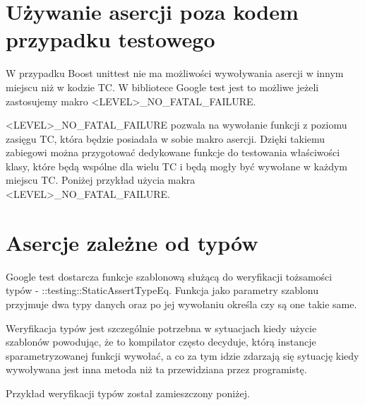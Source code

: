 \documentclass[12pt,a4paper,notitlepage]{report}
\begin{document}
\section{Używanie asercji poza kodem przypadku testowego}

W przypadku Boost unittest nie ma możliwości wywoływania asercji w innym miejscu niż w kodzie TC. W bibliotece Google test jest to możliwe jeżeli zastosujemy makro <LEVEL>{\_}NO{\_}FATAL{\_}FAILURE.

<LEVEL>{\_}NO{\_}FATAL{\_}FAILURE pozwala na wywołanie funkcji z poziomu zasięgu TC, która będzie posiadała w sobie makro asercji. Dzięki takiemu zabiegowi można przygotować dedykowane funkcje do testowania właściwości klasy, które będą wspólne dla wielu TC i będą mogły być wywołane w każdym miejscu TC. Poniżej przykład użycia makra <LEVEL>{\_}NO{\_}FATAL{\_}FAILURE.

			

\section{Asercje zależne od typów}

Google test dostarcza funkcje szablonową służącą do weryfikacji tożsamości typów - ::testing::StaticAssertTypeEq. Funkcja jako parametry szablonu przyjmuje dwa typy danych oraz po jej wywołaniu określa czy są one takie same.

Weryfikacja typów jest szczególnie potrzebna w sytuacjach kiedy użycie szablonów powodując, że to kompilator często decyduje, którą instancje sparametryzowanej funkcji wywołać, a co za tym idzie zdarzają się sytuację kiedy wywoływana jest inna metoda niż ta przewidziana przez programistę.

Przykład weryfikacji typów został zamieszczony poniżej.

			

	
	
	\begin{thebibliography}{1}
		
	  

	 \end{thebibliography}
\end{document}

